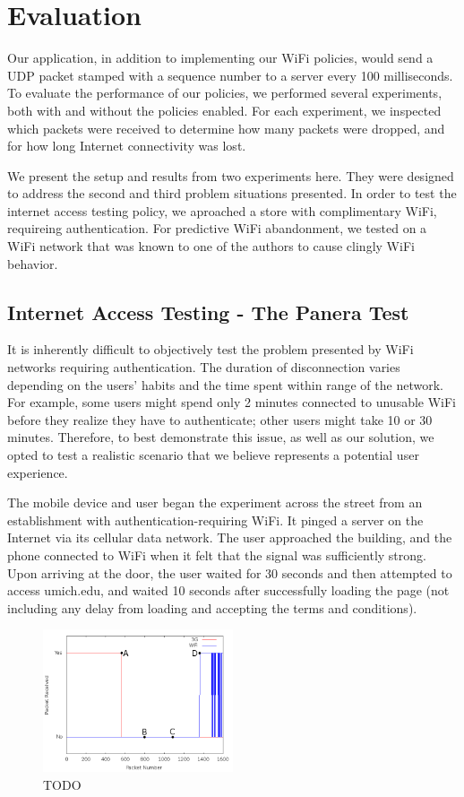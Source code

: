 \section{Evaluation}
\label{sec:eval}

Our application, in addition to implementing our WiFi policies, would send a UDP packet stamped with a sequence number to a server every 100 milliseconds. To evaluate the performance of our policies, we performed several experiments, both with and without the policies enabled. For each experiment, we inspected which packets were received to determine how many packets were dropped, and for how long Internet connectivity was lost.

We present the setup and results from two experiments here. They were designed to address the second and third problem situations presented. In order to test the internet access testing policy, we aproached a store with complimentary WiFi, requireing authentication. For predictive WiFi abandonment, we tested on a WiFi network that was known to one of the authors to cause clingly WiFi behavior.

\subsection{Internet Access Testing - The Panera Test}
It is inherently difficult to objectively test the problem presented by WiFi networks requiring authentication. The duration of disconnection varies depending on the users' habits and the time spent within range of the network. For example, some users might spend only 2 minutes connected to unusable WiFi before they realize they have to authenticate; other users might take 10 or 30 minutes. Therefore, to best demonstrate this issue, as well as our solution, we opted to test a realistic scenario that we believe represents a potential user experience.

The mobile device and user began the experiment across the street from an establishment with authentication-requiring WiFi. It pinged a server on the Internet via its cellular data network. The user approached the building, and the phone connected to WiFi when it felt that the signal was sufficiently strong. Upon arriving at the door, the user waited for 30 seconds and then attempted to access umich.edu, and waited 10 seconds after successfully loading the page (not including any delay from loading and accepting the terms and conditions).

\begin{figure}
	\includegraphics[width=0.5\textwidth]{paneraNoPolicy}
	\caption{TODO}
\end{figure}

